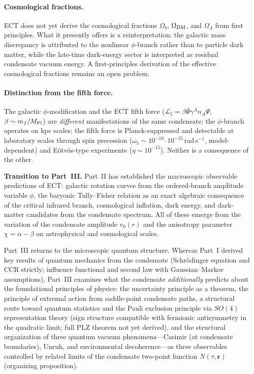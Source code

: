 \documentclass[11pt,a4paper]{article}
\numberwithin{equation}{section}
\begin{document}
\paragraph{Cosmological fractions.}
ECT does not yet derive the cosmological fractions
$\Omega_b$, $\Omega_{\rm DM}$, and $\Omega_\Lambda$ from
first principles.  What it presently offers is a
reinterpretation: the galactic mass discrepancy is attributed
to the nonlinear $\phi$-branch rather than to particle dark
matter, while the late-time dark-energy sector is interpreted
as residual condensate vacuum energy.  A first-principles
derivation of the effective cosmological fractions remains
an open problem.

\paragraph{Distinction from the fifth force.}
The galactic $\phi$-modification and the ECT fifth force
($\mathcal{L}_5 = \beta\bar\Psi\gamma^A n_A\Psi$,
$\beta \sim m_f/M_{\rm Pl}$) are \emph{different}
manifestations of the same condensate:
the $\phi$-branch operates on kpc scales;
the fifth force is Planck-suppressed and detectable at
laboratory scales through spin precession
($\omega_5 \sim 10^{-10}$--$10^{-15}$\,rad\,s$^{-1}$, model-dependent) and
E\"otv\"os-type experiments ($\eta \sim 10^{-15}$).
Neither is a consequence of the other.

\bigskip
\noindent
\textbf{Transition to Part~III.}
Part~II has established the macroscopic observable predictions of ECT:
galactic rotation curves from the ordered-branch amplitude variable $\phi$,
the baryonic Tully--Fisher relation as an exact algebraic consequence
of the critical infrared branch, cosmological inflation, dark energy,
and dark-matter candidates from the condensate spectrum.
All of these emerge from the variation of the condensate
amplitude $v_0(r)$ and the anisotropy parameter $\chi = \alpha-\beta$
on astrophysical and cosmological scales.

Part~III returns to the microscopic quantum structure.
Whereas Part~I derived key results of quantum mechanics from the condensate
(Schrödinger equation and CCR strictly; influence functional and second law
with Gaussian--Markov assumptions), Part~III examines
what the condensate \emph{additionally} predicts about the foundational
principles of physics: the uncertainty principle as a theorem,
the principle of extremal action from saddle-point condensate paths,
a structural route toward quantum statistics and the Pauli exclusion
principle via $SO(4)$ representation theory (sign structure compatible
with fermionic antisymmetry in the quadratic limit;
full PLZ theorem not yet derived),
and the structural organization of three quantum vacuum phenomena---Casimir
(at condensate boundaries), Unruh, and environmental decoherence---as
three observables controlled by related limits of the condensate
two-point function $N(\tau,\mathbf{r})$ (organizing proposition).
\end{document}
